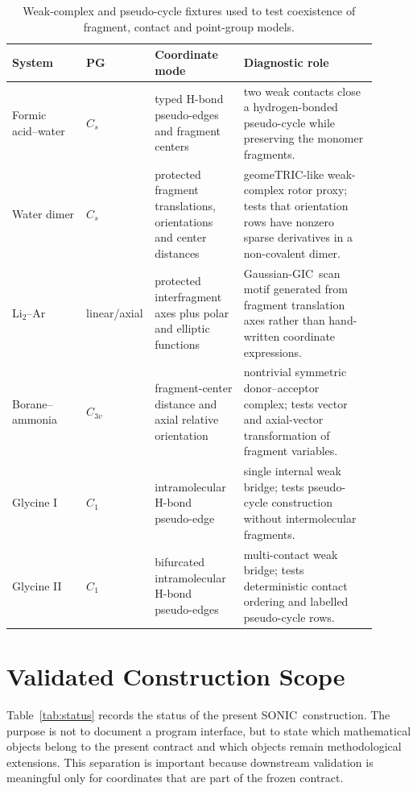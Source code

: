 \documentclass[journal=jctcce,manuscript=article,layout=traditional]{achemso}
\newcommand{\SONIC}{SONIC}
\newcommand{\GIC}{GIC}
\theoremstyle{definition}
\begin{document}
\begin{table}[htbp]
\centering
\scriptsize
\setlength{\tabcolsep}{3pt}
\renewcommand{\arraystretch}{0.95}
\caption{Weak-complex and pseudo-cycle fixtures used to test coexistence of
fragment, contact and point-group models.}
\label{tab:pseudo-cycle-fixtures}
\begin{tabular}{@{}p{0.20\linewidth}p{0.10\linewidth}p{0.24\linewidth}p{0.36\linewidth}@{}}
\toprule
System & PG & Coordinate mode & Diagnostic role \\
\midrule
Formic acid--water & \(C_s\) & typed H-bond pseudo-edges and fragment centers &
two weak contacts close a hydrogen-bonded pseudo-cycle while preserving the
monomer fragments. \\
\midrule
Water dimer & \(C_s\) & protected fragment translations, orientations and
center distances & geomeTRIC-like weak-complex rotor proxy; tests that
orientation rows have nonzero sparse derivatives in a non-covalent dimer. \\
\midrule
Li\(_2\)--Ar & linear/axial & protected interfragment axes plus polar and
elliptic functions & Gaussian-\GIC\ scan motif generated from fragment
translation axes rather than hand-written coordinate expressions. \\
\midrule
Borane--ammonia & \(C_{3v}\) & fragment-center distance and axial relative
orientation & nontrivial symmetric donor--acceptor complex; tests vector and
axial-vector transformation of fragment variables. \\
\midrule
Glycine I & \(C_1\) & intramolecular H-bond pseudo-edge & single internal
weak bridge; tests pseudo-cycle construction without intermolecular fragments. \\
\midrule
Glycine II & \(C_1\) & bifurcated intramolecular H-bond pseudo-edges &
multi-contact weak bridge; tests deterministic contact ordering and labelled
pseudo-cycle rows. \\
\bottomrule
\end{tabular}
\end{table}

\section{Validated Construction Scope}

Table~\ref{tab:status} records the status of the present \SONIC\
construction.  The purpose is not to document a program interface, but to state
which mathematical objects belong to the present contract and which
objects remain methodological extensions.  This separation is important because
downstream validation is meaningful only for coordinates that are part of the
frozen contract.
\end{document}
